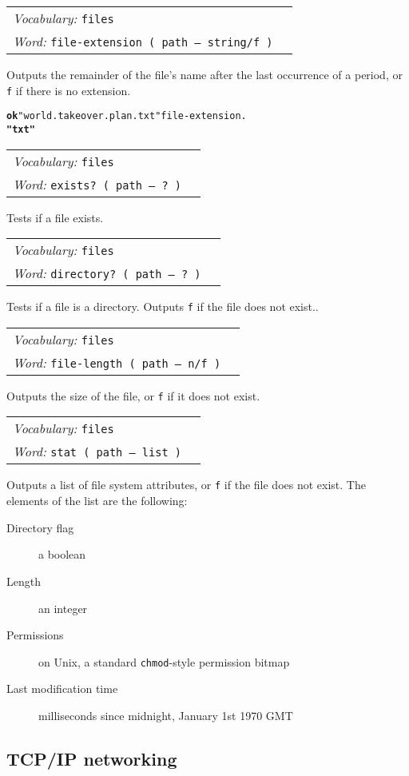 \documentclass{book}
\newcommand{\vocabulary}[1]{\emph{Vocabulary:} \texttt{#1}&\\}
\newcommand{\ordinaryword}[2]{\index{\texttt{#1}}\emph{Word:} \texttt{#2}&\\}
\newcommand{\wordtable}[1]{

\begin{tabularx}{12cm}[t]{lX}
\hline
#1
\hline
\end{tabularx}

}
\begin{document}
\wordtable{
\vocabulary{files}
\ordinaryword{file-extension}{file-extension~( path -- string/f )}

}
Outputs the remainder of the file's name after the last occurrence of a period, or \texttt{f} if there is no extension.
\begin{alltt}
\textbf{ok} "world.takeover.plan.txt" file-extension .
\textbf{"txt"}
\end{alltt}
\wordtable{
\vocabulary{files}
\ordinaryword{exists?}{exists?~( path -- ?~)}

}
Tests if a file exists.
\wordtable{
\vocabulary{files}
\ordinaryword{directory?}{directory?~( path -- ?~)}

}
Tests if a file is a directory. Outputs \texttt{f} if the file does not exist..
\wordtable{
\vocabulary{files}
\ordinaryword{file-length}{file-length~( path -- n/f~)}

}
Outputs the size of the file, or \texttt{f} if it does not exist.
\wordtable{
\vocabulary{files}
\ordinaryword{stat}{stat~( path -- list~)}

}
Outputs a list of file system attributes, or \texttt{f} if the file does not exist. The elements of the list are the following:
\begin{description}
\item[Directory flag] a boolean
\item[Length] an integer
\item[Permissions] on Unix, a standard \texttt{chmod}-style permission bitmap
\item[Last modification time] milliseconds since midnight, January 1st 1970 GMT
\end{description}

\subsection{TCP/IP networking}
\end{document}
